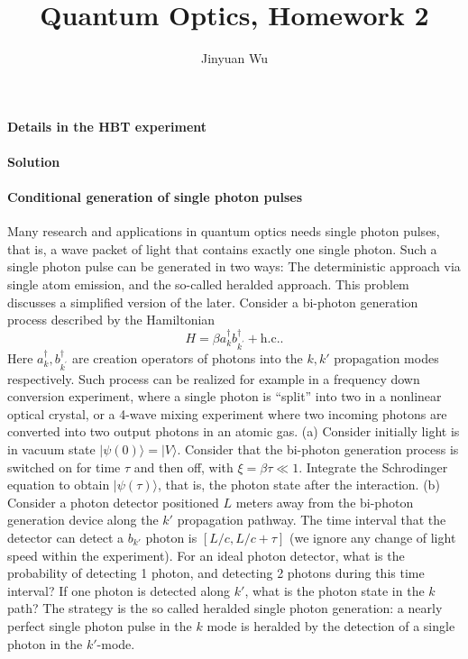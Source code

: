 \documentclass[hyperref, a4paper]{article}
\title{Quantum Optics, Homework 2}
\author{Jinyuan Wu}
\begin{document}
\maketitle

\paragraph{Details in the HBT experiment} 

\paragraph{Solution}

\paragraph{}

\paragraph{Conditional generation of single photon pulses} Many research and applications in quantum optics needs single photon pulses, that is, a wave packet of light that contains exactly one single photon. Such a single photon pulse can be generated in two ways: The deterministic approach via single atom emission, and the so-called heralded approach. This problem discusses a simplified version of the later.
Consider a bi-photon generation process described by the Hamiltonian  
\begin{equation}
    H=\beta a_{k}^\dagger b_{k^{\prime}}^\dagger+ \text{h.c.}.
\end{equation}
Here $a_{k}^\dagger, b_{k^{\prime}}^\dagger$ are creation operators of photons into the $k, k'$ propagation modes respectively. Such process can be realized for example in a frequency down conversion experiment, where a single photon is ``split'' into two in a nonlinear optical crystal, or a 4-wave mixing experiment where two incoming photons are converted into two output photons in an atomic gas.
(a) Consider initially light is in vacuum state $|\psi(0)\rangle=|V\rangle$. Consider that the bi-photon generation process is switched on for time $\tau$ and then off, with $\xi=\beta \tau \ll 1$. Integrate the Schrodinger equation to obtain $|\psi(\tau)\rangle$, that is, the photon state after the interaction. (b) Consider a photon detector positioned $L$ meters away from the bi-photon generation device along the $k'$ propagation pathway. The time interval that the detector can detect a $b_{k'}$ photon is $[L / c, L / c+\tau]$ (we ignore any change of light speed within the experiment). For an ideal photon detector, what is the probability of detecting 1 photon, and detecting 2 photons during this time interval? If one photon is detected along $k'$, what is the photon state in the $k$ path? The strategy is the so called heralded single photon generation: a nearly perfect single photon pulse in the $k$ mode is heralded by the detection of a single photon in the $k'$-mode.
\end{document}
